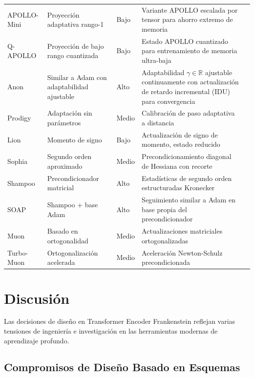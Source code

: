 \documentclass[11pt,a4paper]{article}
\begin{document}
\begin{longtable}{p{2.2cm}p{2.8cm}p{2.0cm}p{5.4cm}p{1.8cm}}
APOLLO-Mini & Proyección adaptativa rango-1 & Bajo & Variante APOLLO escalada por tensor para ahorro extremo de memoria & \citep{zhu2025apollosgdlikememoryadamwlevel} \\
Q-APOLLO & Proyección de bajo rango cuantizada & Bajo & Estado APOLLO cuantizado para entrenamiento de memoria ultra-baja & \citep{zhu2025apollosgdlikememoryadamwlevel} \\
Anon & Similar a Adam con adaptabilidad ajustable & Alto & Adaptabilidad $\gamma \in \mathbb{R}$ ajustable continuamente con actualización de retardo incremental (IDU) para convergencia & \citep{anon2026anon} \\
Prodigy & Adaptación sin parámetros & Medio & Calibración de paso adaptativa a distancia & \citep{mishchenko_prodigy_2023} \\
Lion & Momento de signo & Bajo & Actualización de signo de momento, estado reducido & \citep{chen_symbolic_2023} \\
Sophia & Segundo orden aproximado & Medio & Precondicionamiento diagonal de Hessiana con recorte & \citep{liu_sophia_2023} \\
Shampoo & Precondicionador matricial & Alto & Estadísticas de segundo orden estructuradas Kronecker & \citep{gupta_shampoo_2018} \\
SOAP & Shampoo + base Adam & Alto & Seguimiento similar a Adam en base propia del precondicionador & \citep{vyas_soap_2024} \\
Muon & Basado en ortogonalidad & Medio & Actualizaciones matriciales ortogonalizadas & \citep{shen_convergence_2025} \\
Turbo-Muon & Ortogonalización acelerada & Medio & Aceleración Newton-Schulz precondicionada & \citep{boissin_turbo-muon_2025} \\
\bottomrule
\end{longtable}
\normalsize

\section{Discusión}
\label{sec:discussion}

Las decisiones de diseño en Transformer Encoder Frankenstein reflejan varias tensiones de ingeniería e investigación en las herramientas modernas de aprendizaje profundo.

\subsection{Compromisos de Diseño Basado en Esquemas}
\end{document}
